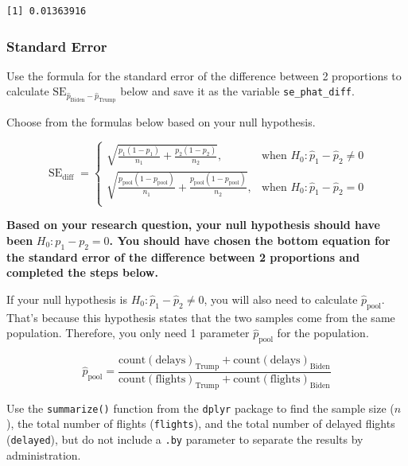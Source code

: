 \documentclass[
  letterpaper,
  DIV=11,
  numbers=noendperiod]{scrartcl}
\begin{document}
\begin{verbatim}
[1] 0.01363916
\end{verbatim}

\subsubsection{Standard Error}\label{standard-error}

Use the formula for the standard error of the difference between 2
proportions to calculate
\(\text{SE}_{\hat{p}_{\text{Biden}}-\hat{p}_{\text{Trump}}}\) below and
save it as the variable \texttt{se\_phat\_diff}.

Choose from the formulas below based on your null hypothesis.

\[
\operatorname{SE}_{\text{diff}}=
\begin{cases}
\sqrt{\frac{p_1(1-p_1)}{n_1} + \frac{p_2(1-p_2)}{n_2}}, & \text{when } H_0\colon \hat{p}_1-\hat{p}_2\ne 0 \\
\sqrt{\frac{p_{\text{pool}}(1-p_{\text{pool}})}{n_1} + \frac{p_{\text{pool}}(1-p_{\text{pool}})}{n_2}}, & \text{when } H_0\colon \hat{p}_1-\hat{p}_2 = 0 \\
\end{cases}
\]

\begin{tcolorbox}[enhanced jigsaw, colback=white, breakable, arc=.35mm, left=2mm, colframe=quarto-callout-warning-color-frame, opacityback=0, rightrule=.15mm, toprule=.15mm, bottomrule=.15mm, leftrule=.75mm]

\textbf{Based on your research question, your null hypothesis should
have been} \(H_0: p_1-p_2=0\)\textbf{. You should have chosen the bottom
equation for the standard error of the difference between 2 proportions
and completed the steps below.}

\end{tcolorbox}

If your null hypothesis is \(H_0\colon \hat{p}_1-\hat{p}_2\ne 0\), you
will also need to calculate \(\hat{p}_{\text{pool}}\). That's because
this hypothesis states that the two samples come from the same
population. Therefore, you only need 1 parameter
\(\hat{p}_{\text{pool}}\) for the population.

\[
\hat{p}_{\text{pool}}=\frac{\text{count}(\text{delays})_{\text{Trump}} + \text{count}(\text{delays})_{\text{Biden}}}{\text{count}(\text{flights})_{\text{Trump}} + \text{count}(\text{flights})_{\text{Biden}}}
\]

Use the \texttt{summarize()} function from the \texttt{dplyr} package to
find the sample size (\(n\)), the total number of flights
(\texttt{flights}), and the total number of delayed flights
(\texttt{delayed}), but do not include a \texttt{.by} parameter to
separate the results by administration.
\end{document}
